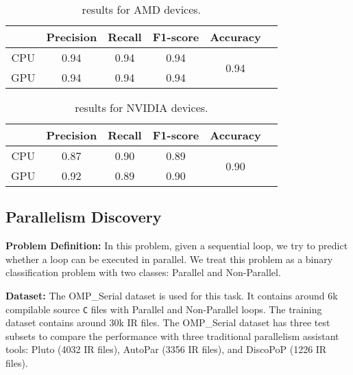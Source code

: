 \vspace{-5mm}

\vspace{-5pt}
\begin{minipage}{.37\textwidth}
\begin{table}[H]
\captionsetup{justification=centering}
  \caption{\ourtool results for AMD devices.}
  \small
  \setlength\tabcolsep{3.5pt}
  \label{tab:perf-matr-1}
  \centering
  \begin{tabular}{cccccc}
    \toprule
     & Precision & Recall & F1-score & Accuracy \\
    \midrule
    CPU  & 0.94 & 0.94 & 0.94 & \multirow{2}{*}{0.94}\\
    GPU  & 0.94 & 0.94 & 0.94 & \\
    \bottomrule
  \end{tabular}
\end{table}
\end{minipage}
\hspace{20mm}
\begin{minipage}{.37\textwidth}
\begin{table}[H]
\captionsetup{justification=centering}
  \caption{\ourtool results for NVIDIA devices.}
  \small
  \setlength\tabcolsep{3.5pt}
  \label{tab:perf-matr-2}
  \centering
  \begin{tabular}{cccccc}
    \toprule
     & Precision & Recall & F1-score & Accuracy \\
    \midrule
    CPU  & 0.87 & 0.90 & 0.89 & \multirow{2}{*}{0.90}\\
    GPU  & 0.92 & 0.89 & 0.90 & \\
    \bottomrule
  \end{tabular}
\end{table}
\end{minipage}

\vspace{-5pt}
\subsection{Parallelism Discovery}

\textbf{Problem Definition:}
In this problem, given a sequential loop, we try to predict whether a loop can be executed in parallel. We treat this problem as a binary classification problem with two classes: Parallel and Non-Parallel.

\textbf{Dataset:}
The OMP\_Serial dataset \cite{chen2023learning} is used for this task. It contains around 6k compilable source \texttt{C} files with Parallel and Non-Parallel loops.
The training dataset contains around 30k IR files. The OMP\_Serial dataset has three test subsets to compare the performance with three traditional parallelism assistant tools: Pluto (4032 IR files), AutoPar (3356 IR files), and DiscoPoP (1226 IR files). 

